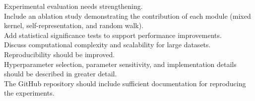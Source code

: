 \documentclass{ar2rc}
\begin{document}
\begin{tcolorbox}[title = {The Reviewer \#1's Comment 4}]
Experimental evaluation needs strengthening. \\
Include an ablation study demonstrating the contribution of each module (mixed kernel, self-representation, and random walk). \\
Add statistical significance tests to support performance improvements. \\
Discuss computational complexity and scalability for large datasets. \\
Reproducibility should be improved. \\
Hyperparameter selection, parameter sensitivity, and implementation details should be described in greater detail. \\
The GitHub repository should include sufficient documentation for reproducing the experiments.
\end{tcolorbox}
\end{document}
